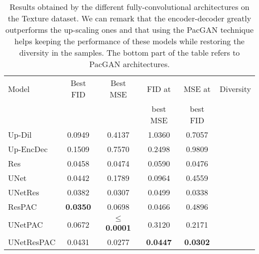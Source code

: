 \begin{table}
	\centering
	\begin{tabular}{|l|c|c|c|c|c|}
		\hline
		Model           & Best \ac{FID} & Best \ac{MSE} & \ac{FID} at & \ac{MSE} at & Diversity\\
		&&&best \ac{MSE} & best \ac{FID} & \\
		\hline
		Up-Dil      & 0.0949 & 0.4137 & 1.0360 & 0.7057 & {\color{green}\cmark } \\
		Up-EncDec  & 0.1509 & 0.7570 & 0.2498 & 0.9809 & {\color{green}\cmark } \\
		Res      & 0.0458 & 0.0474 & 0.0590 & 0.0476 & {\color{red}\xmark } \\
		UNet        & 0.0442 & 0.1789 & 0.0964 & 0.4559 & {\color{red}\xmark } \\
		UNetRes & 0.0382 & 0.0307 & 0.0499 & 0.0338 & {\color{red}\xmark } \\
		\hline
		ResPAC &  \textbf{0.0350} & 0.0698 & 0.0466 & 0.4896 & {\color{green}\cmark } \\
		UNetPAC &  0.0672 & \textbf{$\leq$ 0.0001} & 0.3120 & 0.2171&  {\color{green}\cmark } \\
		UNetResPAC & 0.0431 & 0.0277 & \textbf{0.0447} & \textbf{0.0302} &  {\color{green}\cmark }\\
		\hline
	\end{tabular}
	
	\caption[Results on the Texture dataset for all the selected architectures]{Results obtained by the different fully-convolutional architectures on the Texture dataset. We can remark that the encoder-decoder greatly outperforms the up-scaling ones and that using the PacGAN technique helps keeping the performance of these models while restoring the diversity in the samples. The bottom part of the table refers to PacGAN architectures.}
	\label{tab:ablation}
\end{table}

